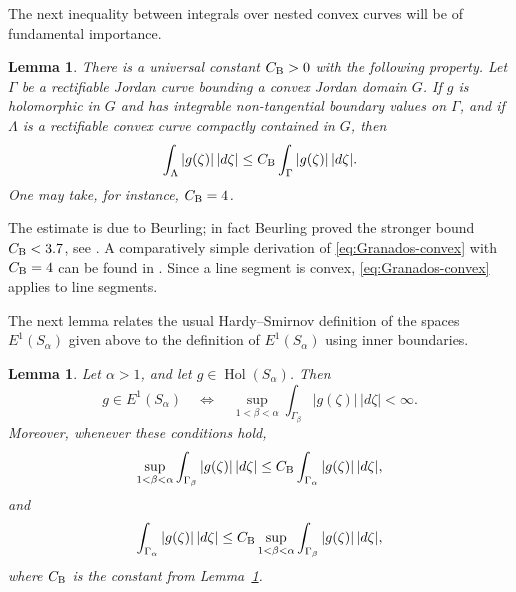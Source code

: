 \documentclass[11pt]{amsart}
\numberwithin{equation}{section}
\newtheorem{lemma}[theorem]{Lemma}
\theoremstyle{definition}
\theoremstyle{plain}
\begin{document}
The next inequality between integrals over nested convex curves
will be of fundamental importance.
\begin{lemma}\label{lem:Granados-convex}
There is a universal constant \(C_{\rm B}>0\) with the following
property.  Let \(\Gamma\) be a rectifiable Jordan curve bounding a convex
Jordan domain \(G\).  If \(g\) is holomorphic in \(G\) and has integrable
non-tangential boundary values on \(\Gamma\), and if \(\Lambda\) is a rectifiable convex
curve compactly contained in \(G\), then
\begin{equation}\label{eq:Granados-convex}
        \int_\Lambda |g(\zeta)|\,|d\zeta|
        \le
        C_{\rm B}
        \int_\Gamma |g(\zeta)|\,|d\zeta| .
\end{equation}
One may take, for instance, \(C_{\rm B}=4\).
\end{lemma}

The estimate is due to Beurling; in fact Beurling proved the stronger bound
\(C_{\rm B}<3.7\), see \cite[p.~456]{Beurling-CW1}.  A comparatively simple derivation
of \eqref{eq:Granados-convex} with $C_{\rm B}=4$ can be found in
\cite[p. 468]{Granados}.
Since a line segment is convex, \eqref{eq:Granados-convex} applies to 
line segments. 




The next lemma relates  the usual
Hardy--Smirnov definition of the spaces $E^1(S_\alpha)$ given above to the definition of $E^1(S_\alpha)$ using inner boundaries.

\begin{lemma}\label{lem:touching-E1}
Let \(\alpha>1\), and let \(g\in \operatorname{Hol}(S_\alpha)\). Then
\[
        g\in E^1(S_\alpha)
        \quad\Longleftrightarrow\quad
        \sup_{1<\beta<\alpha}
        \int_{\Gamma_\beta}|g(\zeta)|\,|d\zeta|<\infty .
\]
Moreover, whenever these conditions hold,
\begin{equation}\label{eq:touching-E1-two-sided}
        \sup_{1<\beta<\alpha}
        \int_{\Gamma_\beta}|g(\zeta)|\,|d\zeta|
        \le
        C_{\rm B}
        \int_{\Gamma_\alpha}|g(\zeta)|\,|d\zeta|,
\end{equation}
and
\begin{equation}\label{eq:touching-E1-reverse}
        \int_{\Gamma_\alpha}|g(\zeta)|\,|d\zeta|
        \le
        C_{\rm B}
        \sup_{1<\beta<\alpha}
        \int_{\Gamma_\beta}|g(\zeta)|\,|d\zeta|,
\end{equation}
where \(C_{\rm B}\) is the constant from Lemma~\ref{lem:Granados-convex}.
\end{lemma}
\end{document}
